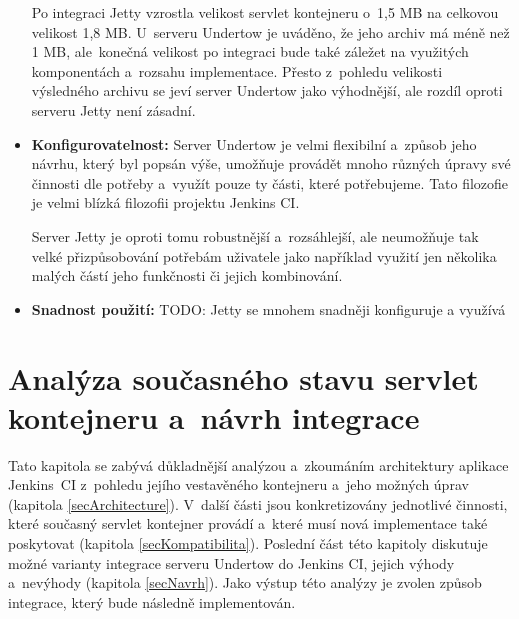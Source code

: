 \begin{itemize}
{                    Po integraci Jetty vzrostla velikost servlet kontejneru o~1,5 MB na celkovou
                    velikost 1,8 MB. U~serveru Undertow je uváděno, že jeho archiv má méně
                    než 1 MB, ale~konečná velikost po integraci bude také záležet na využitých komponentách
                    a~rozsahu implementace. Přesto z~pohledu velikosti výsledného archivu
                    se jeví server Undertow jako výhodnější, ale rozdíl oproti serveru Jetty není zásadní.}

                \item{\textbf{Konfigurovatelnost:} Server Undertow je velmi flexibilní a~způsob
                    jeho návrhu, který byl popsán výše, umožňuje provádět mnoho různých úpravy 
                    své činnosti dle potřeby a~využít pouze ty části, které potřebujeme.
                    Tato filozofie je velmi blízká filozofii projektu Jenkins CI. 
                    
                    Server Jetty
                    je oproti tomu robustnější a~rozsáhlejší, ale neumožňuje tak velké přizpůsobování potřebám
                    uživatele jako například využití jen několika malých částí jeho funkčnosti či jejich
                    kombinování. }


                \item{\textbf{Snadnost použití:}}  
                TODO: Jetty se mnohem snadněji konfiguruje a využívá
                                                
            \end{itemize}
        


\chapter{Analýza současného stavu servlet kontejneru a~návrh integrace}
    Tato kapitola se zabývá důkladnější analýzou a~zkoumáním architektury aplikace Jenkins~CI
    z~pohledu jejího vestavěného kontejneru a~jeho možných úprav (kapitola \ref{secArchitecture}). 
    V~další části jsou konkretizovány jednotlivé činnosti, které současný servlet kontejner provádí
    a~které musí nová implementace také poskytovat (kapitola \ref{secKompatibilita}).
    Poslední část této kapitoly diskutuje možné varianty integrace serveru Undertow do Jenkins CI,
    jejich výhody a~nevýhody (kapitola \ref{secNavrh}). Jako výstup této analýzy je zvolen způsob integrace, který bude
    následně implementován.

